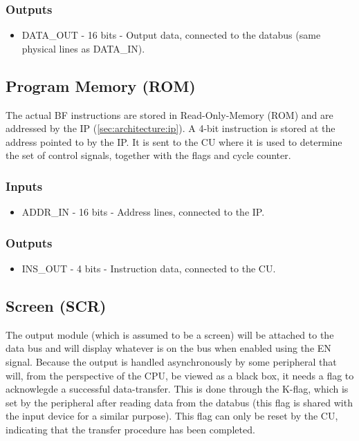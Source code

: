 \subsubsection*{Outputs}
\begin{itemize}
\itemsep0em 
\item DATA\_OUT - 16 bits - Output data, connected to the databus (same physical lines as DATA\_IN).
\end{itemize}

\subsection{Program Memory (ROM)} \label{sec:architecture:rom}
The actual BF instructions are stored in Read-Only-Memory (ROM) and are addressed by the IP (\ref{sec:architecture:ip}). A 4-bit instruction is stored at the address pointed to by the IP. It is sent to the CU where it is used to determine the set of control signals, together with the flags and cycle counter.

\subsubsection*{Inputs}
\begin{itemize}
\itemsep0em 
\item ADDR\_IN - 16 bits - Address lines, connected to the IP.
\end{itemize}

\subsubsection*{Outputs}
\begin{itemize}
\itemsep0em 
\item INS\_OUT - 4 bits - Instruction data, connected to the CU.
\end{itemize}


\subsection{Screen (SCR)}  \label{sec:architecture:scr}
The output module (which is assumed to be a screen) will be attached to the data bus and will display whatever is on the bus  when enabled using the EN signal. Because the output is handled asynchronously by some peripheral that will, from the perspective of the CPU, be viewed as a black box, it needs a flag to acknowlegde a successful data-transfer. This is done through the K-flag, which is set by the peripheral after reading data from the databus (this flag is shared with the input device for a similar purpose). This flag can only be reset by the CU, indicating that the transfer procedure has been completed.
